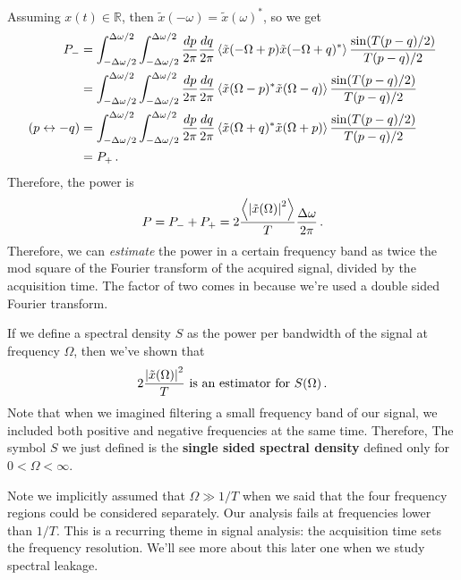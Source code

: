 Assuming $x(t) \in \mathbb{R}$, then $\tilde{x}(-\omega) = \tilde{x}(\omega)^*$, so we get
\begin{align*}
  P_- &=
  \int_{-\Delta \omega/2}^{\Delta\omega/2}
  \int_{-\Delta \omega/2}^{\Delta\omega/2}
  \frac{dp}{2\pi} \frac{dq}{2\pi}
  \left \langle \tilde{x}(-\Omega+p)\tilde{x}(-\Omega+q)^* \right \rangle \frac{\sin(T(p-q)/2)}{T(p-q)/2} \\
  &= \int_{-\Delta \omega/2}^{\Delta\omega/2}
  \int_{-\Delta \omega/2}^{\Delta\omega/2}
  \frac{dp}{2\pi} \frac{dq}{2\pi}
  \left \langle \tilde{x}(\Omega-p)^* \tilde{x}(\Omega-q) \right \rangle \frac{\sin(T(p-q)/2)}{T(p-q)/2} \\
  (p \leftrightarrow -q) &= \int_{-\Delta \omega/2}^{\Delta\omega/2}
  \int_{-\Delta \omega/2}^{\Delta\omega/2}
  \frac{dp}{2\pi} \frac{dq}{2\pi}
  \left \langle \tilde{x}(\Omega+q)^* \tilde{x}(\Omega+p) \right \rangle \frac{\sin(T(p-q)/2)}{T(p-q)/2} \\
  &= P_+ \, .
\end{align*}
Therefore, the power is
\begin{equation}
P = P_- + P_+ = 2 \frac{\left \langle \left \lvert \tilde{x}(\Omega) \right \rvert^2 \right \rangle}{T} \frac{\Delta \omega}{2\pi} \, .
\end{equation}
Therefore, we can \emph{estimate} the power in a certain frequency band as twice the mod square of the Fourier transform of the acquired signal, divided by the acquisition time.
The factor of two comes in because we're used a double sided Fourier transform.

If we define a spectral density $S$ as the power per bandwidth of the signal at frequency $\Omega$, then we've shown that
\begin{equation}
2 \frac{\left \lvert \tilde{x}(\Omega) \right \rvert^2}{T} \text{ is an estimator for } S(\Omega) \, .
\end{equation}
Note that when we imagined filtering a small frequency band of our signal, we included both positive and negative frequencies at the same time.
Therefore, The symbol $S$ we just defined is the \textbf{single sided spectral density} defined only for $0 < \Omega < \infty$.

Note we implicitly assumed that $\Omega \gg 1/T$ when we said that the four frequency regions could be considered separately.
Our analysis fails at frequencies lower than $1/T$.
This is a recurring theme in signal analysis: the acquisition time sets the frequency resolution.
We'll see more about this later one when we study spectral leakage.


